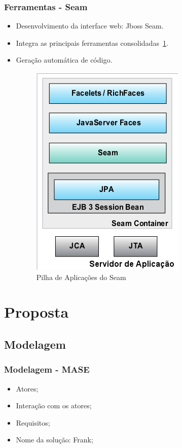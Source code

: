 \documentclass{beamer}
\begin{document}
\begin{frame}
    \frametitle{Ferramentas - Seam}

	\begin{itemize}
  		\item Desenvolvimento da interface web: Jboss Seam.
		\item Integra as principais ferramentas consolidadas~\ref{pilhaSeam}.
		\item Geração automática de código.
	     \begin{figure}[h]
	    	\centering \includegraphics[scale=0.37]{../images/servidor-app-seam.png}
    		\caption{Pilha de Aplicações do Seam}
		\label{pilhaSeam} 
	    \end{figure}
	\end{itemize}
\end{frame}

\section{Proposta}
\subsection{Modelagem}

\begin{frame}
    \frametitle{Modelagem - MASE}
    \begin{itemize}
        \item Atores;
        \item Interação com os atores;
        \item Requisitos;
	\item Nome da solução: Frank;
    \end{itemize}
\end{frame}
\end{document}
